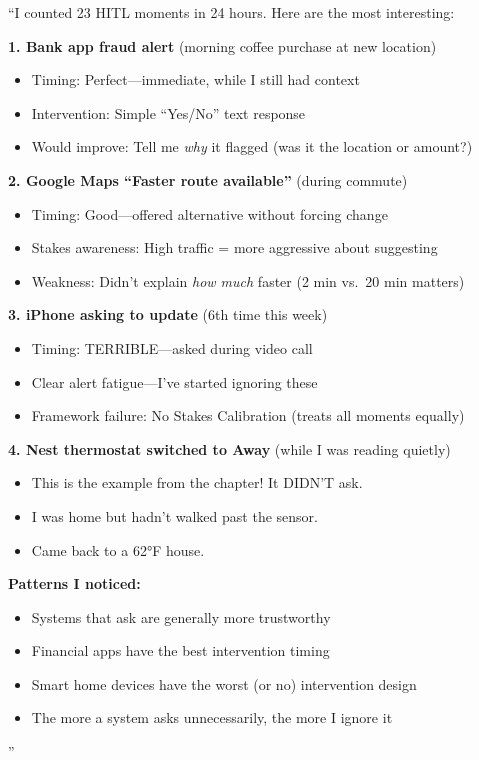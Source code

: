 \begin{storyhook}
``I counted 23 HITL moments in 24 hours. Here are the most interesting:

\textbf{1. Bank app fraud alert} (morning coffee purchase at new location)
\begin{itemize}
    \item Timing: Perfect---immediate, while I still had context
    \item Intervention: Simple ``Yes/No'' text response
    \item Would improve: Tell me \emph{why} it flagged (was it the location or amount?)
\end{itemize}

\textbf{2. Google Maps ``Faster route available''} (during commute)
\begin{itemize}
    \item Timing: Good---offered alternative without forcing change
    \item Stakes awareness: High traffic = more aggressive about suggesting
    \item Weakness: Didn't explain \emph{how much} faster (2 min vs.\ 20 min matters)
\end{itemize}

\textbf{3. iPhone asking to update} (6th time this week)
\begin{itemize}
    \item Timing: TERRIBLE---asked during video call
    \item Clear alert fatigue---I've started ignoring these
    \item Framework failure: No Stakes Calibration (treats all moments equally)
\end{itemize}

\textbf{4. Nest thermostat switched to Away} (while I was reading quietly)
\begin{itemize}
    \item This is the example from the chapter! It DIDN'T ask.
    \item I was home but hadn't walked past the sensor.
    \item Came back to a 62°F house.
\end{itemize}

\textbf{Patterns I noticed:}
\begin{itemize}
    \item Systems that ask are generally more trustworthy
    \item Financial apps have the best intervention timing
    \item Smart home devices have the worst (or no) intervention design
    \item The more a system asks unnecessarily, the more I ignore it
\end{itemize}''
\end{storyhook}

